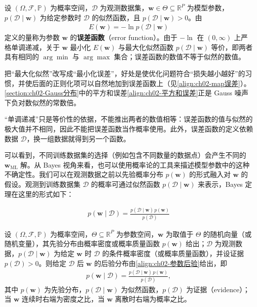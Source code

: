 \documentclass[../../main.tex]{subfiles}
\begin{document}
\begin{definition}[误差函数]\label{definition:ch02-误差函数}
设 $(\Omega,\mathcal{F},\mathbb{P})$ 为概率空间，$\mathcal{D}$ 为观测数据集，$\mathbf{w}\in\Theta\subseteq\mathbb{R}^{P}$ 为模型参数，$p(\mathcal{D}\mid\mathbf{w})$ 为给定参数时 $\mathcal{D}$ 的似然函数，且 $p(\mathcal{D}\mid\mathbf{w})>0$。由
\begin{align*}
  E(\mathbf{w})=-\ln p(\mathcal{D}\mid\mathbf{w})
\end{align*}
定义的量称为参数 $\mathbf{w}$ 的\textbf{误差函数}（error function）。由于 $-\ln$ 在 $(0,\infty)$ 上严格单调递减，关于 $\mathbf{w}$ 最小化 $E(\mathbf{w})$ 与最大化似然函数 $p(\mathcal{D}\mid\mathbf{w})$ 等价，即两者具有相同的 $\arg\min$ 与 $\arg\max$ 集合；误差函数的数值不等于似然的数值。
\end{definition}

\begin{remark}
把“最大化似然”改写成“最小化误差”，好处是使优化问题符合“损失越小越好”的习惯，并使后面的正则化项可以自然地加到误差函数上（见\eqref{align:ch02-map误差}）。\cref{section:ch02-Gauss分布}中的平方和误差\eqref{align:ch02-平方和误差}正是 Gauss 噪声下负对数似然的常数倍。

“单调递减”只是等价性的依据，不能推出两者的数值相等：误差函数的值与似然的极大值并不相同，因此不能把误差函数当作概率使用。此外，误差函数的定义依赖数据 $\mathcal{D}$，换一组数据就得到另一个函数。
\end{remark}

可以看到，不同训练数据集的选择（例如包含不同数量的数据点）会产生不同的 $\mathbf{w}_{\mathrm{ML}}$ 解。从 Bayes 视角来看，也可以使用概率论的工具来描述模型参数中的这种不确定性。我们可以在观测数据之前以先验概率分布 $p(\mathbf{w})$ 的形式融入对 $\mathbf{w}$ 的假设。观测到训练数据集 $\mathcal{D}$ 的概率可通过似然函数 $p(\mathcal{D}\mid\mathbf{w})$ 来表示，Bayes 定理在这里的形式如下：

\begin{align}
  p(\mathbf{w}\mid\mathcal{D}) = \frac{p(\mathcal{D}\mid\mathbf{w})\,p(\mathbf{w})}{p(\mathcal{D})}
  \label{align:ch02-参数后验}
\end{align}

\begin{theorem}\label{theorem:ch02-参数Bayes}
设 $(\Omega,\mathcal{F},\mathbb{P})$ 为概率空间，$\Theta\subseteq\mathbb{R}^{P}$ 为参数空间，$\mathbf{w}$ 为取值于 $\Theta$ 的随机向量（或随机变量），其先验分布由概率密度或概率质量函数 $p(\mathbf{w})$ 给出；$\mathcal{D}$ 为观测数据，$p(\mathcal{D}\mid\mathbf{w})$ 为给定 $\mathbf{w}$ 时 $\mathcal{D}$ 的条件概率密度（或概率质量函数），并设证据 $p(\mathcal{D})>0$。则给定 $\mathcal{D}$ 后 $\mathbf{w}$ 的后验分布由\eqref{align:ch02-参数后验}给出，即
\begin{align*}
  p(\mathbf{w}\mid\mathcal{D})=\frac{p(\mathcal{D}\mid\mathbf{w})\,p(\mathbf{w})}{p(\mathcal{D})},
\end{align*}
其中 $p(\mathbf{w})$ 为先验分布，$p(\mathcal{D}\mid\mathbf{w})$ 为似然函数，$p(\mathcal{D})$ 为证据（evidence）；当 $\mathbf{w}$ 连续时右端为密度之比，当 $\mathbf{w}$ 离散时右端为概率之比。
\end{theorem}
\end{document}
